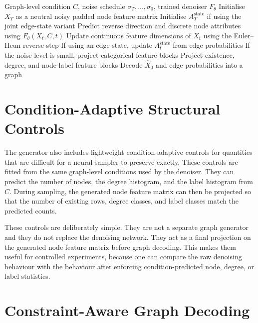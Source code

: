 \begin{algorithm}[H]
\caption{Reverse diffusion sampling of the node feature matrix}
\label{alg:generator:sampling}
\begin{algorithmic}[1]
\Require Graph-level condition \(C\), noise schedule
\(\sigma_T,\ldots,\sigma_0\), trained denoiser \(F_\theta\)
\State Initialise \(X_T\) as a neutral noisy padded node feature matrix
\State Initialise \(A_T^{\mathrm{state}}\) if using the joint edge-state variant
    \State Predict reverse direction and discrete node attributes using \(F_\theta(X_t,C,t)\)
    \State Update continuous feature dimensions of \(X_t\) using the Euler--Heun reverse step
    \State If using an edge state, update \(A_t^{\mathrm{state}}\) from edge probabilities
    \State If the noise level is small, project categorical feature blocks
\EndFor
\State Project existence, degree, and node-label feature blocks
\State Decode \(\hat{X}_0\) and edge probabilities into a graph
\end{algorithmic}
\end{algorithm}

\section{Condition-Adaptive Structural Controls}
\label{sec:generator:condition-controls}

The generator also includes lightweight condition-adaptive controls for
quantities that are difficult for a neural sampler to preserve exactly. These
controls are fitted from the same graph-level conditions used by the denoiser.
They can predict the number of nodes, the degree histogram, and the label
histogram from \(C\). During sampling, the generated node feature matrix can then be
projected so that the number of existing rows, degree classes, and label classes
match the predicted counts.

These controls are deliberately simple. They are not a separate graph generator
and they do not replace the denoising network. They act as a final projection on
the generated node feature matrix before graph decoding. This makes them useful for
controlled experiments, because one can compare the raw denoising behaviour
with the behaviour after enforcing condition-predicted node, degree, or label
statistics.

\section{Constraint-Aware Graph Decoding}
\label{sec:generator:decoding}

